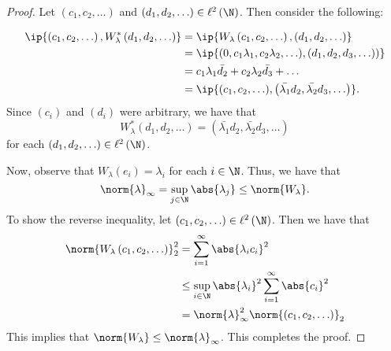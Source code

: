 \horz
\begin{proof}
    Let $\left( c_{1}, c_{2}, \ldots \right)$ and $\left( d_{1}, d_{2}, \ldots \right) \in \ell ^{2} \left( \N \right)$. Then consider the following:

    \begin{align*}
	\ip{\left( c_{1}, c_{2}, \ldots \right), W_{\lambda}^{*} \left( d_{1}, d_{2}, \ldots \right)} &= \ip{W_{\lambda} \left( c_{1}, c_{2}, \ldots \right), (d_{1}, d_{2}, \ldots )} \\
    &= \ip{ \left( 0, c_{1}\lambda_{1}, c_{2} \lambda_{2}, \ldots ), \left( d_{1}, d_{2}, d_{3}, \ldots \right) \right) } \\
    &= c_{1} \lambda_{1} \bar{d_{2}} + c_{2} \lambda_{2} \bar{d_{3}} + \ldots \\
    &= \ip{(c_{1}, c_{2}, \ldots ), \left( \bar{\lambda_{1}} d_{2}, \bar{\lambda_{2}} d_{3} , \ldots \right)}.
    \end{align*}
    Since $\left( c_{i} \right)$ and $\left( d_{i} \right)$ were arbitrary, we have that 
    \begin{equation*}
	W_{\lambda} ^{*} \left( d_{1}, d_{2}, \ldots \right) = \left( \bar{\lambda_{1}} d_{2}, \bar{\lambda_{2}}d_{3}, \ldots \right) 
    \end{equation*}
    for each $\left( d_{1}, d_{2}, \ldots \right) \in \ell ^{2} \left( \N \right)$.

    Now, observe that $W_{\lambda} \left( e_{i} \right) = \lambda_{i}$ for each $i\in \N$. Thus, we have that
    \begin{equation*}
	\norm{\lambda}_{\infty} = \sup_{j \in \N} {\abs{\lambda_{j}}} \le \norm{W_{\lambda}}.
    \end{equation*}
    To show the reverse inequality, let $\left( c_{1}, c_{2}, \ldots \right) \in \ell ^{2} \left( \N \right)$. Then we have that 
    \begin{align*}
	\norm{W_{\lambda} \left( c_{1}, c_{2}, \ldots \right)}_{2} ^{2} &= \sum_{i=1}^{\infty} \abs{\lambda _{i} c_{i}}^{2} \\
	&\le \sup_{i\in \N} \abs{\lambda_{i}}^{2} \sum_{i=1}^{\infty} \abs{c_{i}}^{2} \\
	&= \norm{\lambda}_{\infty}^{2} \norm{\left( c_{1}, c_{2}, \ldots \right)}_{2}
    \end{align*}
    This implies that $\norm{W_{\lambda}} \le \norm{\lambda}_{\infty}$. This completes the proof.
\end{proof}
